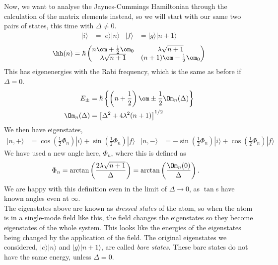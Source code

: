 \documentclass[a4paper, 11pt, normalem]{report}
\begin{document}
Now, we want to analyse the Jaynes-Cummings Hamiltonian through the calculation of the matrix elements instead, so we will start with our same two pairs of states, this time with $\Delta\neq0$.
\begin{align}
    |i\rangle &= |e\rangle|n\rangle & |f\rangle &= |g\rangle|n+1\rangle 
\end{align}
\begin{equation}
    \hh(n) = \hbar\begin{pmatrix}n\om+\frac12\om_0 & \lambda\sqrt{n+1} \\ \lambda\sqrt{n+1} & (n+1)\om-\frac12\om_0 \end{pmatrix}
\end{equation}
This has eigenenergies with the Rabi frequency, which is the same as before if $\Delta=0$.
\begin{align}
    E_{\pm} &= \hbar\left\{\left(n+\frac12\right)\om \pm \frac12\Om_n(\Delta)\right\} \\
    \Om_n(\Delta) &= \left[\Delta^2+ 4\lambda^2(n+1)\right]^{1/2} 
\end{align}
We then have eigenstates, 
\begin{align}
    |n,+\rangle &= \cos\left(\frac12\Phi_n\right)|i\rangle + \sin\left(\frac12\Phi_n\right)|f\rangle & |n,-\rangle &= -\sin\left(\frac12\Phi_n\right)|i\rangle + \cos\left(\frac12\Phi_n\right)|f\rangle
\end{align}
We have used a new angle here, $\Phi_n$, where this is defined as
\begin{align}
    \Phi_n &= \arctan\left(\frac{2\lambda\sqrt{n+1}}{\Delta}\right) = \arctan\left(\frac{\Om_n(0)}{\Delta}\right).
\end{align}
We are happy with this definition even in the limit of $\Delta\to0$, as $\tan$s have known angles even at $\infty$.\\
The eigenstates above are known as \emph{dressed states} of the atom, so when the atom is in a single-mode field like this, the field changes the eigenstates so they become eigenstates of the whole system. 
This looks like the energies of the eigenstates being changed by the application of the field.
The original eigenstates we considered, $|e\rangle|n\rangle$ and $|g\rangle|n+1\rangle$, are called \emph{bare states.}
These bare states do not have the same energy, unless $\Delta=0$.
\end{document}
